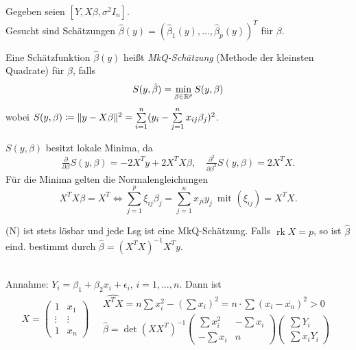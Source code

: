 \documentclass{cheat-sheet}
\DeclareMathOperator{\rk}{rk} %
\begin{document}


\begin{problem}
  Gegeben seien $[Y, X \beta, \sigma^2 I_n]$. \\
  Gesucht sind Schätzungen $\hat{\beta}(y) = (\hat{\beta}_1(y), \ldots, \hat{\beta}_p(y))^T$ für $\beta$.
\end{problem}

\begin{defn}
  Eine Schätzfunktion $\hat{\beta}(y)$ heißt \emph{MkQ-Schätzung} (Methode der kleinsten Quadrate) für $\beta$, falls
  \[ S(y, \hat{\beta}) = \min_{\beta \in \mathbb{R}^p} S(y, \beta) \]
  wobei $S(y, \beta) \coloneqq \norm{y - X \beta}^2 = \sum_{i=1}^n (y_i - \sum_{j=1}^n x_{ij} \beta_j)^2$.
\end{defn}

\begin{bem}
  $S(y, \beta)$ besitzt lokale Minima, da
  \[
    \tfrac{\partial}{\partial \beta} S(y, \beta) = - 2 X^T y + 2 X^T X \beta, \quad
    \tfrac{\partial^2}{\partial \beta^2} S(y, \beta) = 2 X^T X.
  \]
  Für die Minima gelten die Normalengleichungen
  \[
    X^T X \beta = X^T \iff \sum_{j=1}^p \xi_{ij} \beta_j = \sum_{j=1}^n x_{ji} y_j \enspace
    \text{mit } (\xi_{ij}) = X^T X.
    \tag{N}
  \]
\end{bem}

\begin{satz}
  (N) ist stets lösbar und jede Lsg ist eine MkQ-Schätzung.
  Falls $\rk X = p$, so ist $\hat{\beta}$ eind. bestimmt durch $\hat{\beta} = (X^T X)^{-1} X^T y$.
\end{satz}

\begin{bsp} \mbox{} \\
  Annahme: \enspace
  $Y_i = \beta_1 + \beta_2 x_i + \epsilon_i$, \enspace
  $i = 1, \ldots, n$.
  Dann ist
  \[
    X = \begin{pmatrix}
      1 & x_1 \\
      \vdots & \vdots \\
      1 & x_n
    \end{pmatrix} \quad
    \begin{array}{l}
      \hat{X^T X} = n \sum x_i^2 - \left( \sum x_i \right)^2 = n \cdot \sum (x_i - \overline{x_n})^2 > 0 \\[4pt]
      \hat{\beta} = \det(X X^T)^{-1} \begin{pmatrix}
        \sum x_i^2 & - \sum x_i \\
        - \sum x_i & n
      \end{pmatrix} \begin{pmatrix}
        \sum Y_i \\
        \sum x_i Y_i
      \end{pmatrix}
    \end{array}
  \]
\end{bsp}
\end{document}
